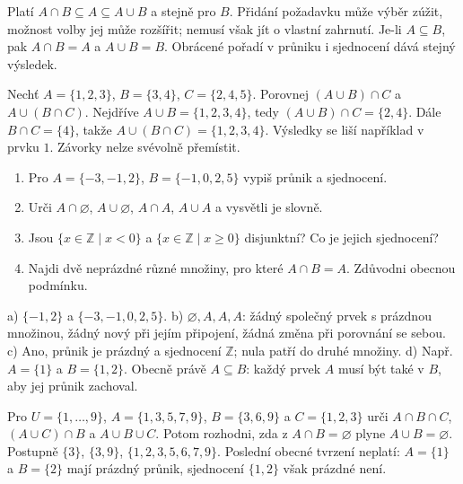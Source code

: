 \documentclass[11pt,a4paper]{article}
\begin{document}
Platí $A\cap B\subseteq A\subseteq A\cup B$ a stejně pro $B$.
Přidání požadavku může výběr zúžit, možnost volby jej může rozšířit;
nemusí však jít o vlastní zahrnutí. Je-li $A\subseteq B$, pak
$A\cap B=A$ a $A\cup B=B$. Obrácené pořadí v průniku i sjednocení dává stejný výsledek.

\begin{prikladReseniBox}[title={P3: tři množiny a závorky},breakable=false]
Nechť $A=\{1,2,3\}$, $B=\{3,4\}$, $C=\{2,4,5\}$.
Porovnej $(A\cup B)\cap C$ a $A\cup(B\cap C)$.
\tcblower
Nejdříve $A\cup B=\{1,2,3,4\}$, tedy $(A\cup B)\cap C=\{2,4\}$.
Dále $B\cap C=\{4\}$, takže $A\cup(B\cap C)=\{1,2,3,4\}$.
Výsledky se liší například v prvku $1$. Závorky nelze svévolně přemístit.
\end{prikladReseniBox}

\begin{zadaniReseniBox}[title={S1: od výčtu ke vztahu}]
\begin{enumerate}[label=\alph*)]
\item Pro $A=\{-3,-1,2\}$, $B=\{-1,0,2,5\}$ vypiš průnik a sjednocení.
\item Urči $A\cap\varnothing$, $A\cup\varnothing$, $A\cap A$, $A\cup A$ a vysvětli je slovně.
\item Jsou $\{x\in\mathbb Z\mid x<0\}$ a $\{x\in\mathbb Z\mid x\ge0\}$
disjunktní? Co je jejich sjednocení?
\item Najdi dvě neprázdné různé množiny, pro které $A\cap B=A$.
Zdůvodni obecnou podmínku.
\end{enumerate}
\tcblower
a) $\{-1,2\}$ a $\{-3,-1,0,2,5\}$.
b) $\varnothing,A,A,A$: žádný společný prvek s prázdnou množinou,
žádný nový při jejím připojení, žádná změna při porovnání se sebou.
c) Ano, průnik je prázdný a sjednocení $\mathbb Z$; nula patří do druhé množiny.
d) Např. $A=\{1\}$ a $B=\{1,2\}$. Obecně právě $A\subseteq B$:
každý prvek $A$ musí být také v $B$, aby jej průnik zachoval.
\end{zadaniReseniBox}

\begin{zadaniReseniBox}[title={R1: obě podmínky nemusí znamenat obě množiny stejné}]
Pro $U=\{1,\ldots,9\}$, $A=\{1,3,5,7,9\}$, $B=\{3,6,9\}$ a $C=\{1,2,3\}$
urči $A\cap B\cap C$, $(A\cup C)\cap B$ a $A\cup B\cup C$.
Potom rozhodni, zda z $A\cap B=\varnothing$ plyne $A\cup B=\varnothing$.
\tcblower
Postupně $\{3\}$, $\{3,9\}$, $\{1,2,3,5,6,7,9\}$.
Poslední obecné tvrzení neplatí: $A=\{1\}$ a $B=\{2\}$
mají prázdný průnik, sjednocení $\{1,2\}$ však prázdné není.
\end{zadaniReseniBox}
\end{document}

